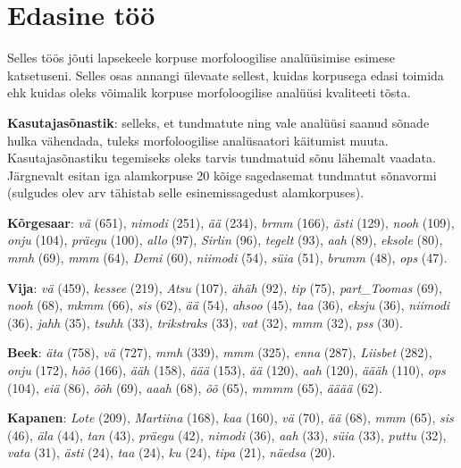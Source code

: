 \documentclass[12pt]{article}
\begin{document}
\newpage
\section{Edasine töö}

Selles töös jõuti lapsekeele korpuse morfoloogilise analüüsimise esimese katsetuseni. Selles osas annangi ülevaate sellest, kuidas korpusega edasi toimida ehk kuidas oleks võimalik korpuse morfoloogilise analüüsi kvaliteeti tõsta.

\textbf{Kasutajasõnastik}: selleks, et tundmatute ning vale analüüsi saanud sõnade hulka vähendada, tuleks morfoloogilise analüsaatori käitumist muuta. Kasutajasõnastiku tegemiseks oleks tarvis tundmatuid sõnu lähemalt vaadata. Järgnevalt esitan iga alamkorpuse 20 kõige sagedasemat tundmatut sõnavormi (sulgudes olev arv tähistab selle esinemissagedust alamkorpuses).

\textbf{Kõrgesaar}: \emph{vä} (651), \emph{nimodi} (251), \emph{ää} (234), \emph{brmm} (166), \emph{ästi} (129), \emph{nooh} (109), \emph{onju} (104), \emph{präegu} (100), \emph{allo} (97), \emph{Sirlin} (96), \emph{tegelt} (93), \emph{aah} (89), \emph{eksole} (80), \emph{mmh} (69), \emph{mmm} (64), \emph{Demi} (60), \emph{niimodi} (54), \emph{süia} (51), \emph{brumm} (48), \emph{ops} (47).

\textbf{Vija}: \emph{vä} (459), \emph{kessee} (219), \emph{Atsu} (107), \emph{ähäh} (92), \emph{tip} (75), \emph{part\_Toomas} (69), \emph{nooh} (68), \emph{mkmm} (66), \emph{sis} (62), \emph{ää} (54), \emph{ahsoo} (45), \emph{taa} (36), \emph{eksju} (36), \emph{niimodi} (36), \emph{jahh} (35), \emph{tsuhh} (33), \emph{trikstraks} (33), \emph{vat} (32), \emph{mmm} (32), \emph{pss} (30).

\textbf{Beek}: \emph{äta} (758), \emph{vä} (727), \emph{mmh} (339), \emph{mmm} (325), \emph{enna} (287), \emph{Liisbet} (282), \emph{onju} (172), \emph{hõõ} (166), \emph{ääh} (158), \emph{äää} (153), \emph{ää} (120), \emph{aah} (120), \emph{äääh} (110), \emph{ops} (104), \emph{eiä} (86), \emph{õõh} (69), \emph{aaah} (68), \emph{õõ} (65), \emph{mmmm} (65), \emph{ääää} (62).

\textbf{Kapanen}: \emph{Lote} (209), \emph{Martiina} (168), \emph{kaa} (160), \emph{vä} (70), \emph{ää} (68), \emph{mmm} (65), \emph{sis} (46), \emph{äla} (44), \emph{tan} (43), \emph{präegu} (42), \emph{nimodi} (36), \emph{aah} (33), \emph{süia} (33), \emph{puttu} (32), \emph{vata} (31), \emph{ästi} (24), \emph{taa} (24), \emph{ku} (24), \emph{tipa} (21), \emph{näedsa} (20).
\end{document}
